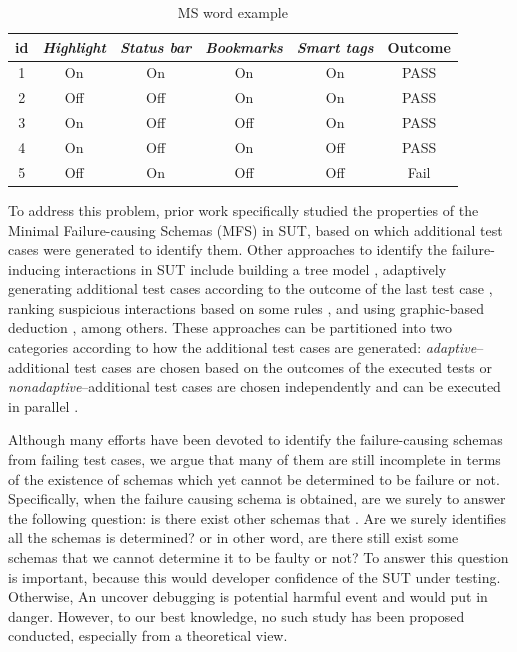 \begin{table}
\caption{MS word example} \centering
  \label{MS_word}
  \setlength{\tabcolsep}{3pt}
  \begin{tabular}{c|cccc|c}\hline
id& \emph{Highlight} & \emph{Status bar} & \emph{Bookmarks}& \emph{Smart tags} & \bfseries{Outcome} \\\hline
1& On & On & On& On & PASS\\ \hline
2& Off & Off & On & On & PASS\\ \hline
3&On & Off & Off &On&  PASS\\ \hline
4&On & Off &On & Off&  PASS\\ \hline
5&Off&	On&	Off&Off & Fail\\ \hline
  \end{tabular}
\end{table}

To address this problem, prior work \cite{nie2011minimal} specifically studied the properties of the Minimal Failure-causing Schemas (MFS) in SUT, based on which additional test cases were generated to identify them. Other approaches to identify the failure-inducing interactions in SUT include building a tree model \cite{yilmaz2006covering}, adaptively generating additional test cases according to the outcome of the last test case \cite{zhang2011characterizing}, ranking suspicious interactions based on some rules \cite{ghandehari2012identifying}, and using graphic-based deduction \cite{martinez2008algorithms}, among others. These approaches can be partitioned into two categories \cite{colbourn2008locating} according to how the additional test cases are generated: \emph{adaptive}--additional test cases are chosen based on the outcomes of the executed tests \cite{shi2005software,nie2011minimal,ghandehari2012identifying,niu2013identifying,zhang2011characterizing,shakya2012isolating,wang2010adaptive,li2012improved}or \emph{nonadaptive}--additional test cases are chosen independently and can be executed in parallel \cite{yilmaz2006covering,colbourn2008locating,martinez2008algorithms,martinez2009locating,zhang2012faulty}.

Although many efforts have been devoted to identify the failure-causing schemas from failing test cases, we argue that many of them are still incomplete in terms of the existence of schemas which yet cannot be determined to be failure or not. Specifically, when the failure causing schema is obtained, are we surely to answer the following question: is there exist other schemas that . Are we surely identifies all the schemas is determined? or in other word, are there still exist some schemas that we cannot determine it to be faulty or not? To answer this question is important, because this would developer confidence of the SUT under testing. Otherwise, An uncover debugging is potential harmful event and would put in danger. However, to our best knowledge, no such study has been proposed conducted, especially from a theoretical view.


